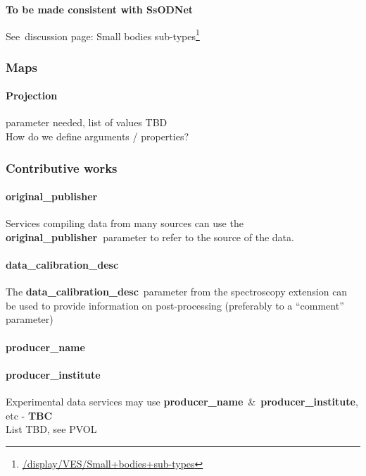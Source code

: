 \documentclass[11pt,a4paper]{ivoa}
\begin{document}
\textbf{To be made consistent with SsODNet\emph{\\}}

See discussion page: Small bodies sub-types\footnote{\url{/display/VES/Small+bodies+sub-types}}

\subsubsection{Maps\\}

\paragraph{Projection }

parameter needed, list of values TBD\\How do we define arguments / properties?

\subsubsection{Contributive works\\}

\paragraph{original\_publisher}

Services compiling data from many sources can use the \textbf{original\_publisher }parameter to refer to the source of the data.

\paragraph{data\_calibration\_desc}

The\textbf{ }\textbf{data\_calibration\_desc} parameter from the spectroscopy extension can be used to provide information on post-processing (preferably to a ``comment'' parameter)

\paragraph{producer\_name}

\paragraph{producer\_institute\\}

Experimental data services may use \textbf{producer\_name} \& \textbf{producer\_institute}, etc - \textbf{TBC}\\List TBD, see PVOL
\end{document}
